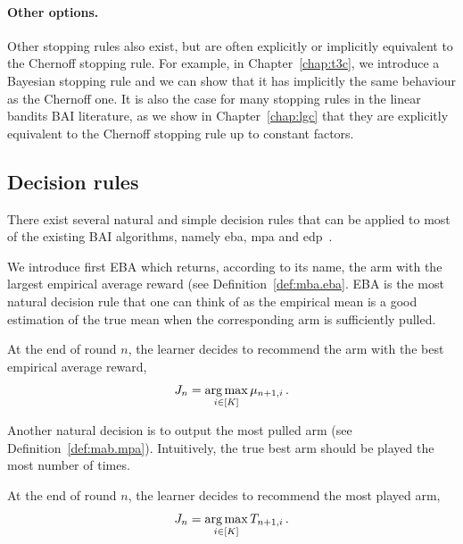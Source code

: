 \paragraph{Other options.}
Other stopping rules also exist, but are often explicitly or implicitly equivalent to the Chernoff stopping rule. For example, in Chapter~\ref{chap:t3c}, we introduce a \gls{Bayesian stopping rule} and we can show that it has implicitly the same behaviour as the Chernoff one. It is also the case for many stopping rules in the linear bandits BAI literature, as we show in Chapter~\ref{chap:lgc} that they are explicitly equivalent to the Chernoff stopping rule up to constant factors.

\subsection{Decision rules}\label{sec:mab.bai.decision}

There exist several natural and simple decision rules that can be applied to most of the existing BAI algorithms, namely \gls{eba}, \gls{mpa} and \gls{edp}~\citep{bubeck2009pure}.

We introduce first EBA which returns, according to its name, the arm with the largest empirical average reward (see Definition~\ref{def:mba.eba}. EBA is the most natural decision rule that one can think of as the empirical mean is a good estimation of the true mean when the corresponding arm is sufficiently pulled.

\begin{definition}
\begin{leftbar}[defnbar]\label{def:mba.eba}
    At the end of round $n$, the learner decides to recommend the arm with the best empirical average reward,
    \[
        J_n = \operatorname*{arg\,max}_{i\in[K]} \mu_{n+1,i}\,.
    \]
\end{leftbar}
\end{definition}

Another natural decision is to output the most pulled arm (see Definition~\ref{def:mab.mpa}). Intuitively, the true best arm should be played the most number of times.

\begin{definition}
\begin{leftbar}[defnbar]\label{def:mab.mpa}
    At the end of round $n$, the learner decides to recommend the most played arm,
    \[
        J_n = \operatorname*{arg\,max}_{i\in[K]} T_{n+1,i}\,.
    \]
\end{leftbar}
\end{definition}

